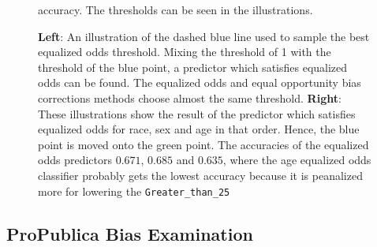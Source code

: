 \documentclass[11pt, fleqn, titlepage]{article}
\begin{document}
\begin{figure}[H]
\begin{subfigure}{0.5\textwidth}
		\end{subfigure}
		\caption{\textbf{Left}: An illustration of the dashed blue line used to sample the best equalized odds threshold. Mixing the threshold of 1 with the threshold of the blue point, a predictor which satisfies equalized odds can be found. The equalized odds and equal opportunity bias corrections methods choose almost the same threshold.  \textbf{Right}: These illustrations show the result of the predictor which satisfies equalized odds for race, sex and age in that order. Hence, the blue point is moved onto the green point. The accuracies of the equalized odds predictors $0.671$, $0.685$ and $0.635$, where the age equalized odds classifier probably gets the lowest accuracy because it is peanalized more for lowering the \texttt{Greater\_than\_{25}}} accuracy. The thresholds can be seen in the illustrations.
		\label{fig:equalizedOdds}
	\end{figure}
	
	\subsection{ProPublica Bias Examination}
	
\end{document}
